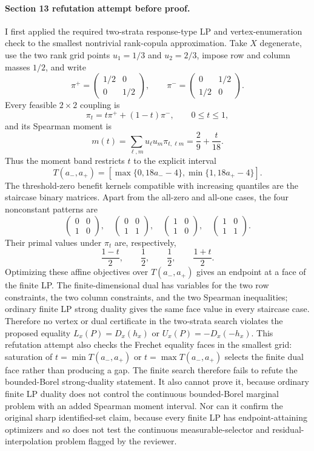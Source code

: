 \paragraph{Section 13 refutation attempt before proof.}
I first applied the required two-strata response-type LP and vertex-enumeration check to the smallest nontrivial rank-copula approximation.  Take \(X\) degenerate, use the two rank grid points \(u_1=1/3\) and \(u_2=2/3\), impose row and column masses \(1/2\), and write
\[
\pi^+=\begin{pmatrix}1/2&0\\0&1/2\end{pmatrix},
\qquad
\pi^-=\begin{pmatrix}0&1/2\\1/2&0\end{pmatrix}.
\]
Every feasible \(2\times2\) coupling is
\[
\pi_t=t\pi^+ +(1-t)\pi^-,\qquad 0\le t\le1,
\]
and its Spearman moment is
\[
m(t)=\sum_{\ell,m}u_\ell u_m\pi_{t,\ell m}
=\frac{2}{9}+\frac{t}{18}.
\]
Thus the moment band restricts \(t\) to the explicit interval
\[
T(a_-,a_+)=
\left[\max\{0,18a_- -4\},\min\{1,18a_+ -4\}\right].
\]
The threshold-zero benefit kernels compatible with increasing quantiles are the staircase binary matrices.  Apart from the all-zero and all-one cases, the four nonconstant patterns are
\[
\begin{pmatrix}0&0\\1&0\end{pmatrix},\quad
\begin{pmatrix}0&0\\1&1\end{pmatrix},\quad
\begin{pmatrix}1&0\\1&0\end{pmatrix},\quad
\begin{pmatrix}1&0\\1&1\end{pmatrix}.
\]
Their primal values under \(\pi_t\) are, respectively,
\[
\frac{1-t}{2},\qquad
\frac{1}{2},\qquad
\frac{1}{2},\qquad
\frac{1+t}{2}.
\]
Optimizing these affine objectives over \(T(a_-,a_+)\) gives an endpoint at a face of the finite LP.  The finite-dimensional dual has variables for the two row constraints, the two column constraints, and the two Spearman inequalities; ordinary finite LP strong duality gives the same face value in every staircase case.  Therefore no vertex or dual certificate in the two-strata search violates the proposed equality \(L_x(P)=D_x(h_x)\) or \(U_x(P)=-D_x(-h_x)\).  This refutation attempt also checks the Frechet equality faces in the smallest grid: saturation of \(t=\min T(a_-,a_+)\) or \(t=\max T(a_-,a_+)\) selects the finite dual face rather than producing a gap.  The finite search therefore fails to refute the bounded-Borel strong-duality statement.  It also cannot prove it, because ordinary finite LP duality does not control the continuous bounded-Borel marginal problem with an added Spearman moment interval.  Nor can it confirm the original sharp identified-set claim, because every finite LP has endpoint-attaining optimizers and so does not test the continuous measurable-selector and residual-interpolation problem flagged by the reviewer.

